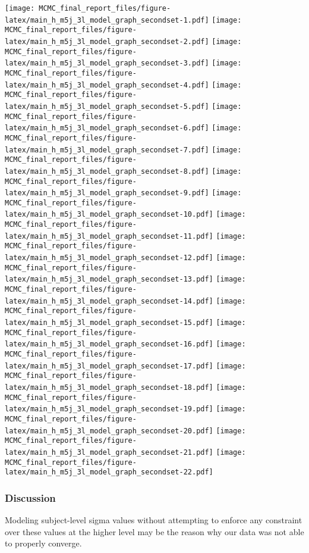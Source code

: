 \documentclass[]{article}
\begin{document}
\texttt{[image: MCMC\_final\_report\_files/figure-latex/main\_h\_m5j\_3l\_model\_graph\_secondset-1.pdf]}
\texttt{[image: MCMC\_final\_report\_files/figure-latex/main\_h\_m5j\_3l\_model\_graph\_secondset-2.pdf]}
\texttt{[image: MCMC\_final\_report\_files/figure-latex/main\_h\_m5j\_3l\_model\_graph\_secondset-3.pdf]}
\texttt{[image: MCMC\_final\_report\_files/figure-latex/main\_h\_m5j\_3l\_model\_graph\_secondset-4.pdf]}
\texttt{[image: MCMC\_final\_report\_files/figure-latex/main\_h\_m5j\_3l\_model\_graph\_secondset-5.pdf]}
\texttt{[image: MCMC\_final\_report\_files/figure-latex/main\_h\_m5j\_3l\_model\_graph\_secondset-6.pdf]}
\texttt{[image: MCMC\_final\_report\_files/figure-latex/main\_h\_m5j\_3l\_model\_graph\_secondset-7.pdf]}
\texttt{[image: MCMC\_final\_report\_files/figure-latex/main\_h\_m5j\_3l\_model\_graph\_secondset-8.pdf]}
\texttt{[image: MCMC\_final\_report\_files/figure-latex/main\_h\_m5j\_3l\_model\_graph\_secondset-9.pdf]}
\texttt{[image: MCMC\_final\_report\_files/figure-latex/main\_h\_m5j\_3l\_model\_graph\_secondset-10.pdf]}
\texttt{[image: MCMC\_final\_report\_files/figure-latex/main\_h\_m5j\_3l\_model\_graph\_secondset-11.pdf]}
\texttt{[image: MCMC\_final\_report\_files/figure-latex/main\_h\_m5j\_3l\_model\_graph\_secondset-12.pdf]}
\texttt{[image: MCMC\_final\_report\_files/figure-latex/main\_h\_m5j\_3l\_model\_graph\_secondset-13.pdf]}
\texttt{[image: MCMC\_final\_report\_files/figure-latex/main\_h\_m5j\_3l\_model\_graph\_secondset-14.pdf]}
\texttt{[image: MCMC\_final\_report\_files/figure-latex/main\_h\_m5j\_3l\_model\_graph\_secondset-15.pdf]}
\texttt{[image: MCMC\_final\_report\_files/figure-latex/main\_h\_m5j\_3l\_model\_graph\_secondset-16.pdf]}
\texttt{[image: MCMC\_final\_report\_files/figure-latex/main\_h\_m5j\_3l\_model\_graph\_secondset-17.pdf]}
\texttt{[image: MCMC\_final\_report\_files/figure-latex/main\_h\_m5j\_3l\_model\_graph\_secondset-18.pdf]}
\texttt{[image: MCMC\_final\_report\_files/figure-latex/main\_h\_m5j\_3l\_model\_graph\_secondset-19.pdf]}
\texttt{[image: MCMC\_final\_report\_files/figure-latex/main\_h\_m5j\_3l\_model\_graph\_secondset-20.pdf]}
\texttt{[image: MCMC\_final\_report\_files/figure-latex/main\_h\_m5j\_3l\_model\_graph\_secondset-21.pdf]}
\texttt{[image: MCMC\_final\_report\_files/figure-latex/main\_h\_m5j\_3l\_model\_graph\_secondset-22.pdf]}

\subsubsection{Discussion}\label{discussion-1}

Modeling subject-level sigma values without attempting to enforce any
constraint over these values at the higher level may be the reason why
our data was not able to properly converge.
\end{document}
